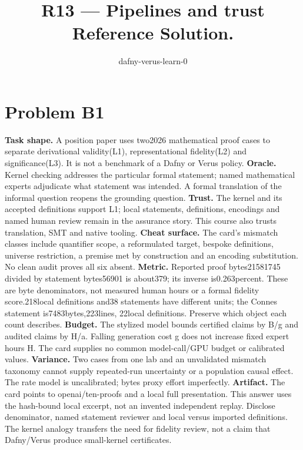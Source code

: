 \documentclass[11pt]{article}
\title{R13 --- Pipelines and trust \\ \large Reference Solution.}
\author{dafny-verus-learn-0}
\date{}
\begin{document}
\maketitle
\sloppy
\section*{Problem B1}\label{ans:B1}
\begin{answer}
\textbf{Task shape.} A position paper uses two2026 mathematical proof cases to
separate derivational validity(L1), representational fidelity(L2) and
significance(L3). It is not a benchmark of a Dafny or Verus policy.
\textbf{Oracle.} Kernel checking addresses the particular formal statement;
named mathematical experts adjudicate what statement was intended. A formal
translation of the informal question reopens the grounding question.
\textbf{Trust.} The kernel and its accepted definitions support L1; local
statements, definitions, encodings and named human review remain in the
assurance story. This course also trusts translation, SMT and native tooling.
\textbf{Cheat surface.} The card's mismatch classes include quantifier scope,
a reformulated target, bespoke definitions, universe restriction, a premise
met by construction and an encoding substitution. No clean audit proves all
six absent.
\textbf{Metric.} Reported proof bytes21581745 divided by statement bytes56901
is about379; its inverse is0.263percent. These are byte denominators, not
measured human hours or a formal fidelity score.218local definitions and38
statements have different units; the Connes statement is7483bytes,223lines,
22local definitions. Preserve which object each count describes.
\textbf{Budget.} The stylized model bounds certified claims by B/g and audited
claims by H/a. Falling generation cost g does not increase fixed expert hours
H. The card supplies no common model-call/GPU budget or calibrated values.
\textbf{Variance.} Two cases from one lab and an unvalidated mismatch taxonomy
cannot supply repeated-run uncertainty or a population causal effect. The
rate model is uncalibrated; bytes proxy effort imperfectly.
\textbf{Artifact.} The card points to openai/ten-proofs and a local full
presentation. This answer uses the hash-bound local excerpt, not an invented
independent replay. Disclose denominator, named statement reviewer and local
versus imported definitions. The kernel analogy transfers the need for
fidelity review, not a claim that Dafny/Verus produce small-kernel certificates.
\end{answer}
\end{document}
